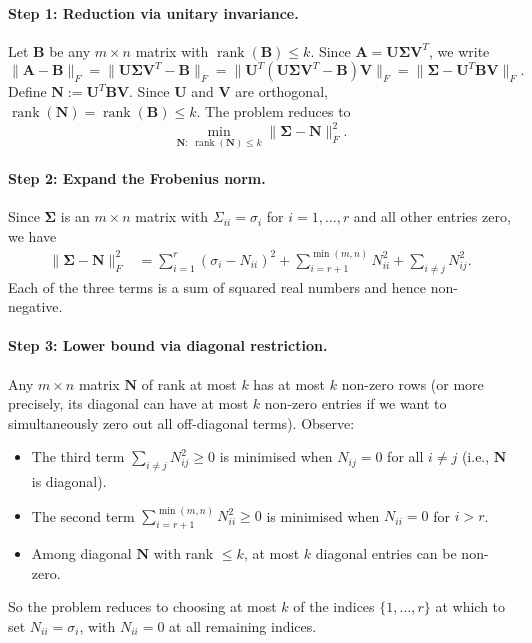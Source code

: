 \documentclass[11pt]{article}
\begin{document}
\paragraph{Step 1: Reduction via unitary invariance.}
Let $\boldsymbol{B}$ be any $m \times n$ matrix with $\operatorname{rank}(\boldsymbol{B}) \leq k$.
Since $\boldsymbol{A} = \boldsymbol{U}\boldsymbol{\Sigma}\boldsymbol{V}^T$, we write
\[
\|\boldsymbol{A} - \boldsymbol{B}\|_F
= \|\boldsymbol{U}\boldsymbol{\Sigma}\boldsymbol{V}^T - \boldsymbol{B}\|_F
= \|\boldsymbol{U}^T(\boldsymbol{U}\boldsymbol{\Sigma}\boldsymbol{V}^T - \boldsymbol{B})\boldsymbol{V}\|_F
= \|\boldsymbol{\Sigma} - \boldsymbol{U}^T\boldsymbol{B}\boldsymbol{V}\|_F.
\]
Define $\boldsymbol{N} := \boldsymbol{U}^T \boldsymbol{B}\boldsymbol{V}$.
Since $\boldsymbol{U}$ and $\boldsymbol{V}$ are orthogonal, $\operatorname{rank}(\boldsymbol{N}) = \operatorname{rank}(\boldsymbol{B}) \leq k$.
The problem reduces to
\[
\min_{\boldsymbol{N}:\;\operatorname{rank}(\boldsymbol{N})\leq k}
\|\boldsymbol{\Sigma} - \boldsymbol{N}\|_F^2.
\]

\paragraph{Step 2: Expand the Frobenius norm.}
Since $\boldsymbol{\Sigma}$ is an $m \times n$ matrix with $\Sigma_{ii} = \sigma_i$ for $i = 1,\dots,r$ and all other entries zero, we have
\begin{align}
\|\boldsymbol{\Sigma} - \boldsymbol{N}\|_F^2
&= \sum_{i=1}^{r}(\sigma_i - N_{ii})^2
 + \sum_{i=r+1}^{\min(m,n)} N_{ii}^2
 + \sum_{i \neq j} N_{ij}^2. \label{eq:expand}
\end{align}
Each of the three terms is a sum of squared real numbers and hence non-negative.

\paragraph{Step 3: Lower bound via diagonal restriction.}
Any $m \times n$ matrix $\boldsymbol{N}$ of rank at most $k$ has at most $k$ non-zero rows
(or more precisely, its diagonal can have at most $k$ non-zero entries if we want to simultaneously
zero out all off-diagonal terms). Observe:
\begin{itemize}
    \item The third term $\sum_{i\neq j}N_{ij}^2 \geq 0$ is minimised when $N_{ij}=0$ for all $i\neq j$
          (i.e., $\boldsymbol{N}$ is diagonal).
    \item The second term $\sum_{i=r+1}^{\min(m,n)} N_{ii}^2 \geq 0$ is minimised when $N_{ii}=0$ for $i > r$.
    \item Among diagonal $\boldsymbol{N}$ with rank $\leq k$, at most $k$ diagonal entries can be non-zero.
\end{itemize}
So the problem reduces to choosing at most $k$ of the indices $\{1,\dots,r\}$ at which to
set $N_{ii} = \sigma_i$, with $N_{ii} = 0$ at all remaining indices.
\end{document}
